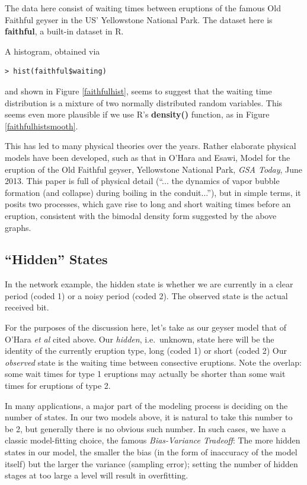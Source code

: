 \documentclass[11pt]{article}
\begin{document}
The data here consist of waiting times between eruptions of the famous
Old Faithful geyser in the US' Yellowstone National Park.  The dataset
here is \textbf{faithful}, a built-in dataset in R.

A histogram, obtained via 

\begin{lstlisting}
> hist(faithful$waiting)
\end{lstlisting}

and shown in Figure \ref{faithfulhist}, seems to suggest that the
waiting time distribution is a mixture of two normally distributed random
variables.  This seems even more plausible if we use R's
\textbf{density()} function, as in Figure \ref{faithfulhistsmooth}.

This has led to many physical theories over the years.  Rather elaborate
physical models have been developed, such as that in O'Hara and Esawi,
Model for the eruption of the Old Faithful geyser, Yellowstone National
Park, \textit{GSA Today}, June 2013.  This paper is full of physical
detail (``... the dynamics of vapor bubble formation (and collapse)
during boiling in the conduit...''), but in simple terms, it posits two
processes, which gave rise to long and short waiting times before an
eruption, consistent with the bimodal density form suggested by the
above graphs.

\subsection{``Hidden'' States}

In the network example, the hidden state is whether we are currently in
a clear period (coded 1) or a noisy period (coded 2).  The observed
state is the actual received bit.

For the purposes of the discussion here, let's take as our geyser model
that of O'Hara \textit{et al} cited above.  Our \textit{hidden}, i.e.\
unknown, state here will be the identity of the currently eruption type,
long (coded 1) or short (coded 2) Our \textit{observed} state is the
waiting time between consective eruptions.  Note the overlap: some wait
times for type 1 eruptions may actually be shorter than some wait times
for eruptions of type 2.

In many applications, a major part of the modeling process is deciding
on the number of states.  In our two models above, it is natural to take
this number to be 2, but generally there is no obvious such number.  In
such cases, we have a classic model-fitting choice, the famous
\textit{Bias-Variance Tradeoff}:  The more hidden states in our model,
the smaller the bias (in the form of inaccuracy of the model itself) but
the larger the variance (sampling error); setting the number of hidden
stages at too large a level will result in overfitting.
\end{document}
